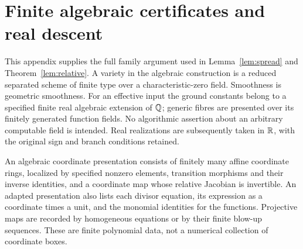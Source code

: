 \section{Finite algebraic certificates and real descent}\label{app:foundations}
This appendix supplies the full family argument used in
Lemma~\ref{lem:spread} and Theorem~\ref{lem:relative}. A variety in the
algebraic construction is a reduced separated scheme of finite type over
a characteristic-zero field. Smoothness is geometric smoothness. For
an effective input the ground constants belong to a specified finite real
algebraic extension of $\mathbb Q$; generic fibres are presented over its
finitely generated function fields. No algorithmic assertion about an
arbitrary computable field is intended. Real realizations are subsequently
taken in $\mathbb R$, with the original sign and branch conditions retained.

An algebraic coordinate presentation consists of finitely many affine
coordinate rings, localized by specified nonzero elements, transition
morphisms and their inverse identities, and a coordinate map whose
relative Jacobian is invertible. An adapted presentation also lists each
divisor equation, its expression as a coordinate times a unit, and the
monomial identities for the functions. Projective maps are recorded by
homogeneous equations or by their finite blow-up sequences. These are
finite polynomial data, not a numerical collection of coordinate boxes.

